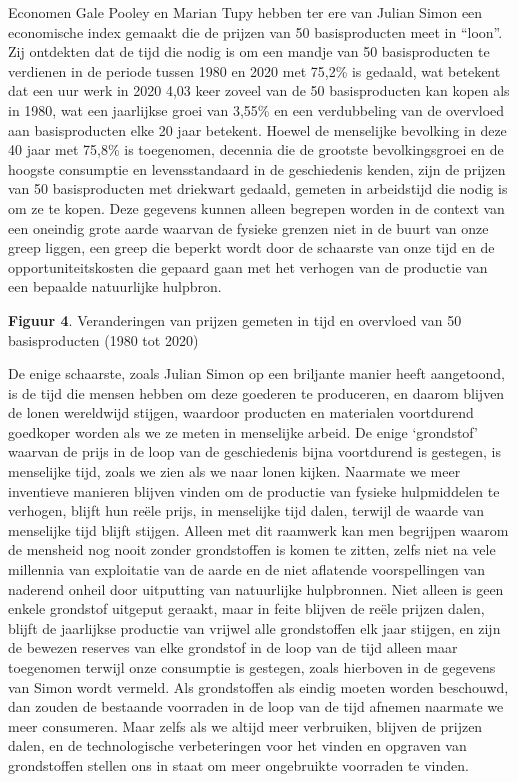 Economen Gale Pooley en Marian Tupy hebben ter ere van Julian Simon een
economische index gemaakt die de prijzen van 50 basisproducten meet in
``loon''. Zij ontdekten dat de tijd die nodig is om een mandje van 50
basisproducten te verdienen in de periode tussen 1980 en 2020 met 75,2\%
is gedaald, wat betekent dat een uur werk in 2020 4,03 keer zoveel van
de 50 basisproducten kan kopen als in 1980, wat een jaarlijkse groei van
3,55\% en een verdubbeling van de overvloed aan basisproducten elke 20
jaar betekent.\autocite{33} Hoewel de menselijke bevolking in deze
40 jaar met 75,8\% is toegenomen, decennia die de grootste
bevolkingsgroei en de hoogste consumptie en levensstandaard in de
geschiedenis kenden, zijn de prijzen van 50 basisproducten met driekwart
gedaald, gemeten in arbeidstijd die nodig is om ze te kopen. Deze
gegevens kunnen alleen begrepen worden in de context van een oneindig
grote aarde waarvan de fysieke grenzen niet in de buurt van onze greep
liggen, een greep die beperkt wordt door de schaarste van onze tijd en
de opportuniteitskosten die gepaard gaan met het verhogen van de
productie van een bepaalde natuurlijke hulpbron.

\textbf{Figuur 4}. Veranderingen van prijzen gemeten in tijd en
overvloed van 50 basisproducten (1980 tot 2020)

De enige schaarste, zoals Julian Simon op een briljante manier heeft
aangetoond, is de tijd die mensen hebben om deze goederen te produceren,
en daarom blijven de lonen wereldwijd stijgen, waardoor producten en
materialen voortdurend goedkoper worden als we ze meten in menselijke
arbeid. De enige `grondstof' waarvan de prijs in de loop van de
geschiedenis bijna voortdurend is gestegen, is menselijke tijd, zoals we
zien als we naar lonen kijken. Naarmate we meer inventieve manieren
blijven vinden om de productie van fysieke hulpmiddelen te verhogen,
blijft hun reële prijs, in menselijke tijd dalen, terwijl de waarde van
menselijke tijd blijft stijgen. Alleen met dit raamwerk kan men
begrijpen waarom de mensheid nog nooit zonder grondstoffen is komen te
zitten, zelfs niet na vele millennia van exploitatie van de aarde en de
niet aflatende voorspellingen van naderend onheil door uitputting van
natuurlijke hulpbronnen. Niet alleen is geen enkele grondstof uitgeput
geraakt, maar in feite blijven de reële prijzen dalen, blijft de
jaarlijkse productie van vrijwel alle grondstoffen elk jaar stijgen, en
zijn de bewezen reserves van elke grondstof in de loop van de tijd
alleen maar toegenomen terwijl onze consumptie is gestegen, zoals
hierboven in de gegevens van Simon wordt vermeld. Als grondstoffen als
eindig moeten worden beschouwd, dan zouden de bestaande voorraden in de
loop van de tijd afnemen naarmate we meer consumeren. Maar zelfs als we
altijd meer verbruiken, blijven de prijzen dalen, en de technologische
verbeteringen voor het vinden en opgraven van grondstoffen stellen ons
in staat om meer ongebruikte voorraden te vinden.


